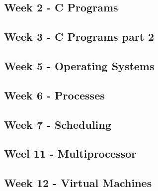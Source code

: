 
\subsection*{Week 2 - C Programs}



\subsection*{Week 3 - C Programs part 2}



\subsection*{Week 5 - Operating Systems}



\subsection*{Week 6 - Processes}



\subsection*{Week 7 - Scheduling}


\subsection*{Weel 11 - Multiprocessor}


\subsection*{Week 12 - Virtual Machines}


